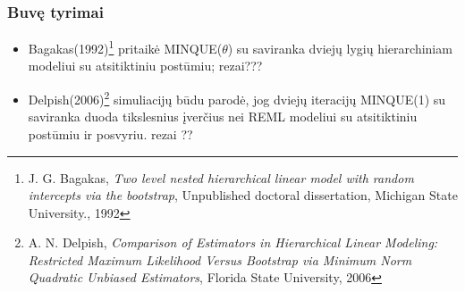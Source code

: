 \documentclass[utf8,hyperref={unicode,pdftex}]{beamer}
\begin{document}
\begin{frame}
\frametitle{Buvę tyrimai}
\begin{itemize}
\item Bagakas(1992)\footnote{ J. G. Bagakas,  \textit{ Two level nested hierarchical linear model with random intercepts
via the bootstrap}, Unpublished doctoral dissertation, Michigan State University., 1992} pritaikė MINQUE($\theta$) su saviranka dviejų lygių hierarchiniam modeliui su atsitiktiniu postūmiu; rezai???
\item Delpish(2006)\footnote{A. N. Delpish,  \textit{Comparison of Estimators in Hierarchical Linear Modeling: Restricted Maximum Likelihood Versus Bootstrap via Minimum Norm Quadratic Unbiased Estimators}, Florida State University, 2006} simuliacijų būdu parodė, jog dviejų iteracijų MINQUE(1) su saviranka duoda tikslesnius įverčius nei REML modeliui su atsitiktiniu postūmiu ir posvyriu. rezai ??
\end{itemize}
\end{frame}
\end{document}
